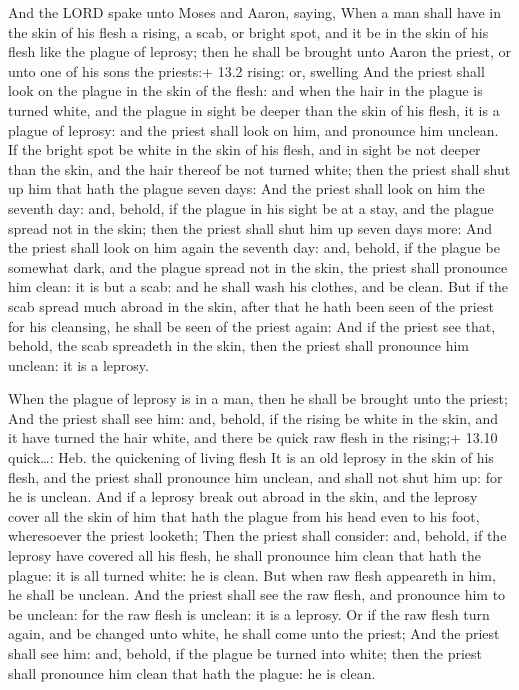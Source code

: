  And the LORD spake unto Moses and Aaron, saying,
 When a man shall have in the skin of his flesh a rising, a
scab, or bright spot, and it be in the skin of his flesh like the plague
of leprosy; then he shall be brought unto Aaron the priest, or unto one
of his sons the priests:+ 13.2 rising: or, swelling  And the
priest shall look on the plague in the skin of the flesh: and when the
hair in the plague is turned white, and the plague in sight be deeper
than the skin of his flesh, it is a plague of leprosy: and the priest
shall look on him, and pronounce him unclean.  If the bright
spot be white in the skin of his flesh, and in sight be not deeper than
the skin, and the hair thereof be not turned white; then the priest
shall shut up him that hath the plague seven days:  And the
priest shall look on him the seventh day: and, behold, if the plague in
his sight be at a stay, and the plague spread not in the skin; then the
priest shall shut him up seven days more:  And the priest
shall look on him again the seventh day: and, behold, if the plague be
somewhat dark, and the plague spread not in the skin, the priest shall
pronounce him clean: it is but a scab: and he shall wash his clothes,
and be clean.  But if the scab spread much abroad in the
skin, after that he hath been seen of the priest for his cleansing, he
shall be seen of the priest again:  And if the priest see
that, behold, the scab spreadeth in the skin, then the priest shall
pronounce him unclean: it is a leprosy.

 When the plague of leprosy is in a man, then he shall be
brought unto the priest;  And the priest shall see him:
and, behold, if the rising be white in the skin, and it have turned the
hair white, and there be quick raw flesh in the rising;+ 13.10
quick\ldots: Heb. the quickening of living flesh  It is an
old leprosy in the skin of his flesh, and the priest shall pronounce him
unclean, and shall not shut him up: for he is unclean.  And
if a leprosy break out abroad in the skin, and the leprosy cover all the
skin of him that hath the plague from his head even to his foot,
wheresoever the priest looketh;  Then the priest shall
consider: and, behold, if the leprosy have covered all his flesh, he
shall pronounce him clean that hath the plague: it is all turned white:
he is clean.  But when raw flesh appeareth in him, he shall
be unclean.  And the priest shall see the raw flesh, and
pronounce him to be unclean: for the raw flesh is unclean: it is a
leprosy.  Or if the raw flesh turn again, and be changed
unto white, he shall come unto the priest;  And the priest
shall see him: and, behold, if the plague be turned into white; then the
priest shall pronounce him clean that hath the plague: he is clean.

